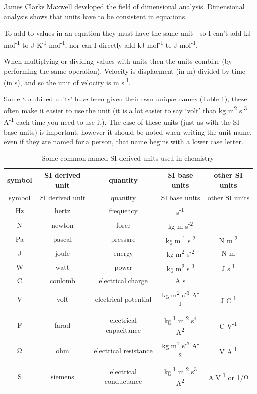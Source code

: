 \documentclass[
]{book}
\begin{document}
James Clarke Maxwell developed the field of dimensional analysis. Dimensional analysis shows that units have to be consistent in equations.

To add to values in an equation they must have the same unit - so I can't add kJ mol\textsuperscript{-1} to J K\textsuperscript{-1} mol\textsuperscript{-1}, nor can I directly add kJ mol\textsuperscript{-1} to J mol\textsuperscript{-1}.

When multiplying or dividing values with units then the units combine (by performing the same operation). Velocity is displacment (in m) divided by time (in s), and so the unit of velocity is m s\textsuperscript{-1}.

Some `combined units' have been given their own unique names (Table \ref{tab:SIderive}), these often make it easier to use the unit (it is a lot easier to say `volt' than kg m\textsuperscript{2} s\textsuperscript{-3} A\textsuperscript{-1} each time you need to use it). The case of these units (just as with the SI base units) is important, however it should be noted when writing the unit name, even if they are named for a person, that name begins with a lower case letter.

\begin{longtable}[]{@{}ccccc@{}}
\caption{\label{tab:SIderive} Some common named SI derived units used in chemistry.}\tabularnewline
\toprule
symbol & SI derived unit & quantity & SI base units & other SI units\tabularnewline
\midrule
\endfirsthead
\toprule
symbol & SI derived unit & quantity & SI base units & other SI units\tabularnewline
\midrule
\endhead
Hz & hertz & frequency & s\textsuperscript{-1} &\tabularnewline
N & newton & force & kg m s\textsuperscript{-2} &\tabularnewline
Pa & pascal & pressure & kg m\textsuperscript{-1} s\textsuperscript{-2} & N m\textsuperscript{-2}\tabularnewline
J & joule & energy & kg m\textsuperscript{2} s\textsuperscript{-2} & N m\tabularnewline
W & watt & power & kg m\textsuperscript{2} s\textsuperscript{-3} & J s\textsuperscript{-1}\tabularnewline
C & coulomb & electrical charge & A s &\tabularnewline
V & volt & electrical potential & kg m\textsuperscript{2} s\textsuperscript{-3} A\textsuperscript{-1} & J C\textsuperscript{-1}\tabularnewline
F & farad & electrical capacitance & kg\textsuperscript{-1} m\textsuperscript{-2} s\textsuperscript{4} A\textsuperscript{2} & C V\textsuperscript{-1}\tabularnewline
Ω & ohm & electrical resistance & kg m\textsuperscript{2} s\textsuperscript{-3} A\textsuperscript{-2} & V A\textsuperscript{-1}\tabularnewline
S & siemens & electrical conductance & kg\textsuperscript{-1} m\textsuperscript{-2} s\textsuperscript{3} A\textsuperscript{2} & A V\textsuperscript{-1} or 1/Ω\tabularnewline
\bottomrule
\end{longtable}
\end{document}
